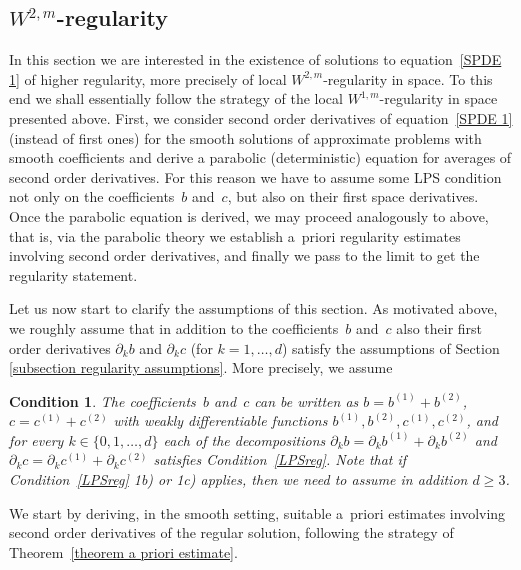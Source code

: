 \documentclass[a4paper,10pt]{article}
\newtheorem{condition}[theorem]{Condition}
\newcommand\1{\mathbbm{1}}
\numberwithin{equation}{section}
\begin{document}
\subsection{$W^{2,m}$-regularity}\label{Section W^2}

In this section we are interested in the existence of solutions to equation~\eqref{SPDE 1} of higher regularity, more precisely of local $W^{2,m}$-regularity in space. To this end we shall essentially follow the strategy of the local $W^{1,m}$-regularity in space presented above. First, we consider second order derivatives of equation~\eqref{SPDE 1} (instead of first ones) for the smooth solutions of approximate problems with smooth coefficients and derive a parabolic (deterministic) equation for averages of second order derivatives. For this reason we have to assume some LPS condition not only on the coefficients~$b$ and~$c$, but also on their first space derivatives. Once the parabolic equation is derived, we may proceed analogously to above, that is, via the parabolic theory we establish a~priori regularity estimates involving second order derivatives, and finally we pass to the limit to get the regularity statement. 

Let us now start to clarify the assumptions of this section. As motivated above, we roughly assume that in addition to the coefficients~$b$ and~$c$ also their first order derivatives $\partial_{k}b$ and $\partial_{k}c$ (for $k=1,\ldots,d$) satisfy the assumptions of Section
\ref{subsection regularity assumptions}. More precisely, we assume

\begin{condition}
\label{LPSreg second order}
The coefficients~$b$ and~$c$ can be written as $b = b^{(1)} + b^{(2)}$, $c = c^{(1)} + c^{(2)}$ with weakly differentiable functions $b^{(1)}, b^{(2)}, c^{(1)}, c^{(2)}$, and  
for every $k \in \{0,1,\ldots,d\}$ each of the decompositions $\partial_k b = \partial_k b^{(1)} + \partial_k b^{(2)}$ and $\partial_k c = \partial_k c^{(1)} + \partial_k c^{(2)}$ satisfies Condition~\ref{LPSreg}. Note that if Condition~\ref{LPSreg} \textup{1b)} or \textup{1c)} applies, then we need to assume in addition $d \geq 3$.
\end{condition}

We start by deriving, in the smooth setting, suitable a~priori estimates involving second order derivatives of the regular solution, following the strategy of Theorem~\ref{theorem a priori estimate}.
\end{document}
